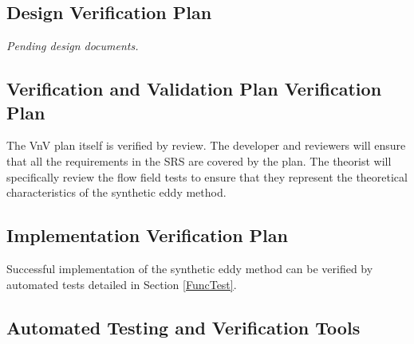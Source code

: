 \documentclass[12pt, titlepage]{article}
\begin{document}

\subsection{Design Verification Plan}

\textit{Pending design documents.}




\subsection{Verification and Validation Plan Verification Plan}

The VnV plan itself is verified by review. The developer and reviewers will ensure that all the requirements in the SRS are covered by the plan. The theorist will specifically review the flow field tests to ensure that they represent the theoretical characteristics of the synthetic eddy method.




\subsection{Implementation Verification Plan}

Successful implementation of the synthetic eddy method can be verified by automated tests detailed in Section \ref{FuncTest}.



\subsection{Automated Testing and Verification Tools}
\end{document}
